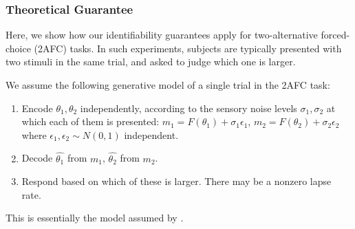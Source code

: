 \documentclass[si.tex]{subfiles}
\begin{document}
\subsubsection{Theoretical Guarantee}

Here, we show how our identifiability guarantees apply for two-alternative forced-choice (2AFC) tasks.
In such experiments, subjects are typically presented with two stimuli in the same trial, and asked to judge which one is larger.

We assume the following generative model of a single trial in the 2AFC task:
\begin{enumerate}
    \item Encode $\theta_1, \theta_2$ independently, according to the sensory noise levels $\sigma_1, \sigma_2$ at which each of them is presented: $m_1 = F(\theta_1) + \sigma_1 \epsilon_1$, $m_2 = F(\theta_2) + \sigma_2 \epsilon_2$ where $\epsilon_1, \epsilon_2 \sim N(0,1)$ independent.
    \item Decode $\widehat{\theta_1}$ from $m_1$, $\widehat{\theta_2}$ from $m_2$.
    \item Respond based on which of these is larger. There may be a nonzero lapse rate.
\end{enumerate}
This is essentially the model assumed by \citet{Girshick2011CardinalRV, Stocker2005}.
\end{document}
